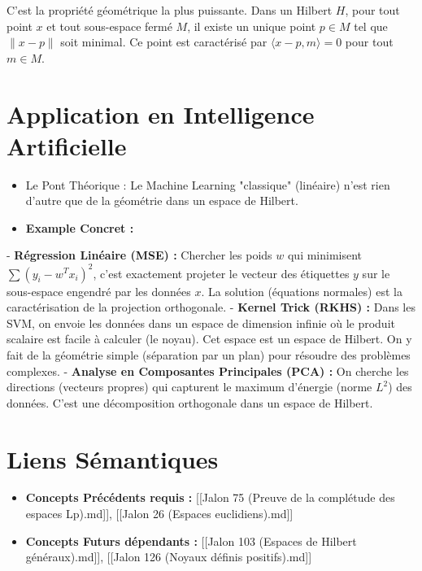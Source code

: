 \documentclass[11pt,a4paper]{article}
\begin{document}
C'est la propriété géométrique la plus puissante. Dans un Hilbert $H$, pour tout point $x$ et tout sous-espace fermé $M$, il existe un unique point $p \in M$ tel que $\|x-p\|$ soit minimal. Ce point est caractérisé par $\langle x-p, m \rangle = 0$ pour tout $m \in M$.

\section{Application en Intelligence Artificielle}

\begin{itemize}
\item Le Pont Théorique : Le Machine Learning "classique" (linéaire) n'est rien d'autre que de la géométrie dans un espace de Hilbert.

\item \textbf{Example Concret :}
\end{itemize}
    - \textbf{Régression Linéaire (MSE) :} Chercher les poids $w$ qui minimisent $\sum (y_i - w^T x_i)^2$, c'est exactement projeter le vecteur des étiquettes $y$ sur le sous-espace engendré par les données $x$. La solution (équations normales) est la caractérisation de la projection orthogonale.
    - \textbf{Kernel Trick (RKHS) :} Dans les SVM, on envoie les données dans un espace de dimension infinie où le produit scalaire est facile à calculer (le noyau). Cet espace est un espace de Hilbert. On y fait de la géométrie simple (séparation par un plan) pour résoudre des problèmes complexes.
    - \textbf{Analyse en Composantes Principales (PCA) :} On cherche les directions (vecteurs propres) qui capturent le maximum d'énergie (norme $L^2$) des données. C'est une décomposition orthogonale dans un espace de Hilbert.

\section{Liens Sémantiques}

\begin{itemize}
\item \textbf{Concepts Précédents requis :} [[Jalon 75 (Preuve de la complétude des espaces Lp).md]], [[Jalon 26 (Espaces euclidiens).md]]

\item \textbf{Concepts Futurs dépendants :} [[Jalon 103 (Espaces de Hilbert généraux).md]], [[Jalon 126 (Noyaux définis positifs).md]]
\end{itemize}
\end{document}
